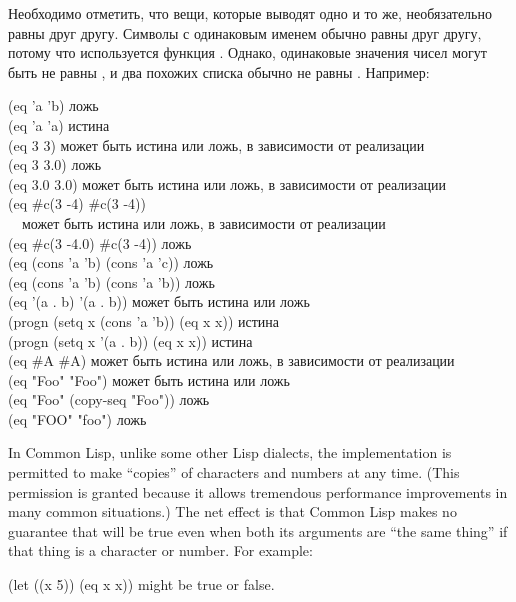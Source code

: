 \begin{defun}[Function]
Необходимо отметить, что вещи, которые выводят одно и то же, необязательно равны
 друг другу. Символы с одинаковым именем обычно равны  друг
другу, потому что используется функция .
Однако, одинаковые значения чисел могут быть не равны , и два похожих
списка обычно не равны .
Например:

\begin{lisp}
(eq 'a 'b) \textrm{ложь} \\
(eq 'a 'a) \textrm{истина} \\
(eq 3 3) \textrm{может быть истина или ложь, в зависимости от реализации} \\
(eq 3 3.0) \textrm{ложь} \\
(eq 3.0 3.0) \textrm{может быть истина или ложь, в зависимости от реализации} \\
(eq \#c(3 -4) \#c(3 -4)) \\
~~\textrm{может быть истина или ложь, в зависимости от реализации} \\
(eq \#c(3 -4.0) \#c(3 -4)) \textrm{ложь} \\
(eq (cons 'a 'b) (cons 'a 'c)) \textrm{ложь} \\
(eq (cons 'a 'b) (cons 'a 'b)) \textrm{ложь} \\
(eq '(a . b) '(a . b)) \textrm{может быть истина или ложь} \\
(progn (setq x (cons 'a 'b)) (eq x x)) \textrm{истина} \\
(progn (setq x '(a . b)) (eq x x)) \textrm{истина} \\
(eq \#{\Xbackslash}A \#{\Xbackslash}A) \textrm{может быть истина или ложь, в зависимости от реализации} \\
(eq "Foo" "Foo") \textrm{может быть истина или ложь} \\
(eq "Foo" (copy-seq "Foo")) \textrm{ложь} \\
(eq "FOO" "foo") \textrm{ложь}
\end{lisp}

In Common Lisp, unlike some other Lisp dialects, the implementation
is permitted to make ``copies'' of
characters and numbers at any time.  (This permission is granted
because it allows tremendous performance improvements in many
common situations.)  The net effect is that
Common Lisp makes no guarantee that  will be true even when both
its arguments are ``the same thing'' if that thing is a character or number.
For example:
\begin{lisp}
(let ((x 5)) (eq x x)) \textrm{might be true or false.}
\end{lisp}


\end{defun}
